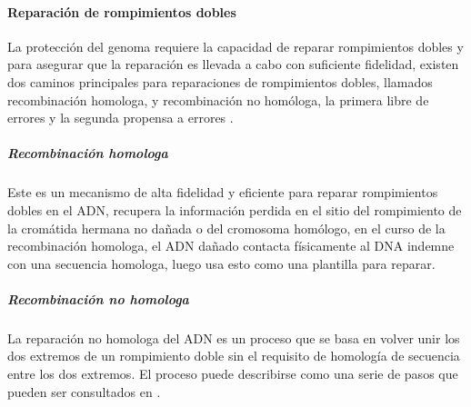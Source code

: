 \paragraph{Reparación de rompimientos dobles}

La protección del genoma requiere la capacidad de reparar rompimientos dobles y para asegurar que la reparación es llevada a cabo con suficiente fidelidad, existen dos caminos principales para reparaciones de rompimientos dobles, llamados recombinación homologa, y recombinación no homóloga, la primera libre de errores y la segunda propensa a errores \cite{rescells}.

\subparagraph{Recombinación homologa}
Este es un mecanismo de alta fidelidad y eficiente para reparar rompimientos dobles en el ADN, recupera la información perdida en el sitio del rompimiento de la cromátida hermana no dañada o del cromosoma homólogo, en el curso de la recombinación homologa, el ADN dañado contacta físicamente al DNA indemne con una secuencia homologa, luego usa esto como una plantilla para reparar\cite{rescells}.

\subparagraph{Recombinación no homologa}

La reparación no homologa del ADN es un proceso que se basa en volver unir los dos extremos de un rompimiento doble sin el requisito de homología de secuencia entre los dos extremos. El proceso puede describirse como una serie de pasos que pueden ser consultados en \cite{rescells}.





